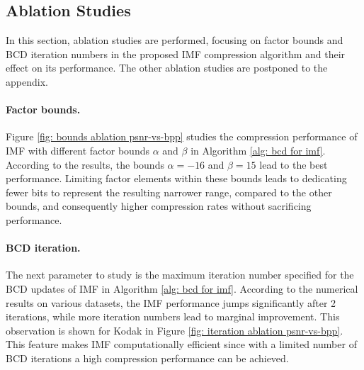\subsection{Ablation Studies} \label{sec: ablation studies}

In this section, ablation studies are performed, focusing on factor bounds and BCD iteration numbers in the proposed IMF compression algorithm and their effect on its performance. The other ablation studies are postponed to the appendix.

\paragraph{Factor bounds.} 
Figure \ref{fig: bounds ablation psnr-vs-bpp} studies the compression performance of IMF with different factor bounds $\alpha$ and $\beta$ in Algorithm \ref{alg: bcd for imf}. According to the results, the bounds $\alpha=-16$ and $\beta=15$ lead to the best performance. Limiting factor elements within these bounds leads to dedicating fewer bits to represent the resulting narrower range, compared to the other bounds, and consequently higher compression rates without sacrificing performance. 

\paragraph{BCD iteration.}
The next parameter to study is the maximum iteration number specified for the BCD updates of IMF in Algorithm \eqref{alg: bcd for imf}. 
According to the numerical results on various datasets, the IMF performance jumps significantly after 2 iterations, while more iteration numbers lead to marginal improvement. 
This observation is shown for Kodak in Figure \ref{fig: iteration ablation psnr-vs-bpp}.
This feature makes IMF computationally efficient since with a limited number of BCD iterations a high compression performance can be achieved.


